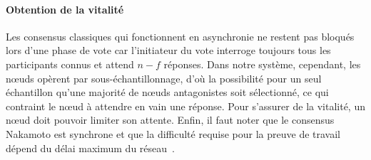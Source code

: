 \documentclass[letterpaper,twocolumn,10pt]{article}
\newcommand{\editinsert}[1]{{\color{blue}#1}}
\theoremstyle{definition}
\begin{document}
\paragraph{Obtention de la vitalité} %
Les consensus classiques qui fonctionnent en asynchronie ne restent pas bloqués lors d'une phase de vote car l'initiateur du vote interroge toujours tous les participants connus et attend $n - f$ réponses.
Dans notre système, cependant, les nœuds opèrent par sous-échantillonnage, d'où la possibilité pour un seul échantillon qu'une majorité de nœuds antagonistes soit sélectionné, ce qui contraint le nœud à attendre en vain une réponse. Pour s'assurer de la vitalité, un nœud doit pouvoir limiter son attente. Enfin, il faut noter que le consensus Nakamoto est synchrone et que la difficulté requise pour la preuve de travail dépend du délai maximum du réseau~\cite{PassSS17}. 

\end{document}
